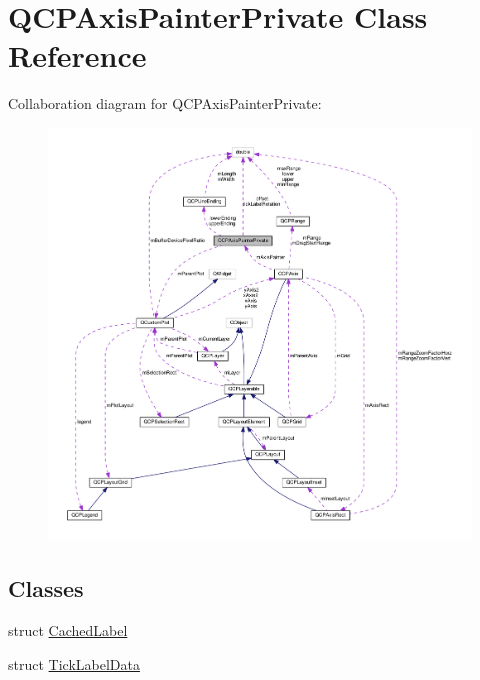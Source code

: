 \hypertarget{classQCPAxisPainterPrivate}{}\section{Q\+C\+P\+Axis\+Painter\+Private Class Reference}
\label{classQCPAxisPainterPrivate}


Collaboration diagram for Q\+C\+P\+Axis\+Painter\+Private\+:
\nopagebreak
\begin{figure}[H]
\begin{center}
\leavevmode
\includegraphics[width=350pt]{classQCPAxisPainterPrivate__coll__graph}
\end{center}
\end{figure}
\subsection*{Classes}
\begin{DoxyCompactItemize}
\item 
struct \hyperlink{structQCPAxisPainterPrivate_1_1CachedLabel}{Cached\+Label}
\item 
struct \hyperlink{structQCPAxisPainterPrivate_1_1TickLabelData}{Tick\+Label\+Data}
\end{DoxyCompactItemize}
